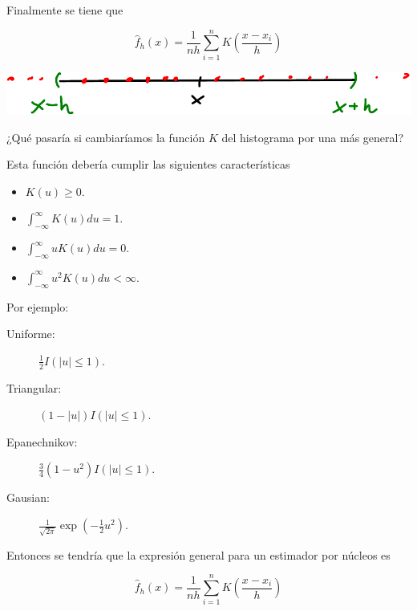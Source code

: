\documentclass[12pt]{book}\usepackage[]{graphicx}\usepackage[]{color}
\theoremstyle{definition}
\theoremstyle{plain}
\begin{document}
Finalmente se tiene que

\begin{equation*}
	\hat{f}_{h}\left( x \right) = \frac{1}{nh}\sum_{i=1}^{n} K\left( \frac{x-x_{i}}{h} \right)
\end{equation*}

\begin{center}
	\includegraphics[width=\linewidth]{manual_figure/np-density-interval-crop.pdf}
\end{center}

\newpage
\begin{pregunta}{}{}
	¿Qué pasaría si cambiaríamos la función \(K\) del histograma por una más general?
\end{pregunta}

Esta función debería cumplir las siguientes características

\begin{itemize}
	\item \(K(u)\geq 0\).
	\item \(\int_{-\infty}^{\infty} K(u)du = 1 \).
	\item \(\int_{-\infty}^{\infty} u K(u)du = 0\).
	\item \(\int_{-\infty}^{\infty} u^{2} K(u)du <\infty\).
\end{itemize}

Por ejemplo:

\begin{description}
	\item[Uniforme:] \(\frac{1}{2} I \left( \left\vert u \right\vert \leq 1 \right)\).
	\item[Triangular:] \( (1-|u|) I \left( \left\vert u \right\vert \leq 1 \right)\).
	\item[Epanechnikov:] \(\frac{3}{4} (1-u^{2}) I \left( \left\vert u \right\vert \leq 1 \right)\).
	\item[Gausian:] \(\frac{1}{\sqrt{2\pi}} \exp \left( -\frac{1}{2}u^{2} \right)\).
\end{description}



Entonces se tendría que la expresión general para un estimador por núcleos es

\begin{equation*}
	\hat{f}_{h}\left( x \right) = \frac{1}{nh}\sum_{i=1}^{n} K\left( \frac{x-x_{i}}{h} \right)
\end{equation*}
\end{document}

